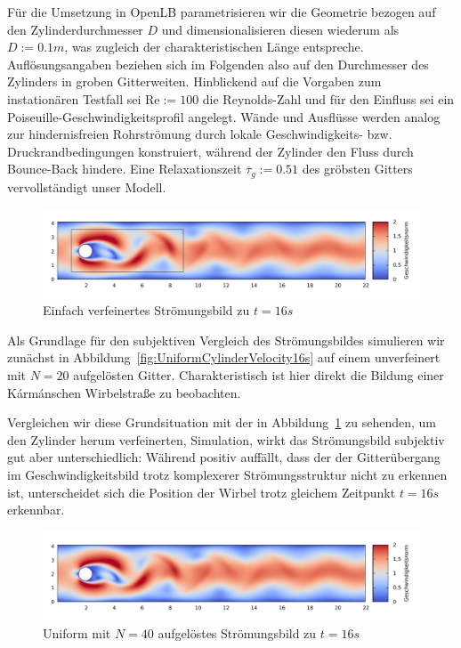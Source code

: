 Für die Umsetzung in OpenLB parametrisieren wir die Geometrie bezogen auf den Zylinderdurchmesser \(D\) und dimensionalisieren diesen wiederum als \(D := 0.1m\), was zugleich der charakteristischen Länge entspreche. Auflösungsangaben beziehen sich im Folgenden also auf den Durchmesser des Zylinders in groben Gitterweiten. Hinblickend auf die Vorgaben zum instationären Testfall \cite[Kapitel~2.2b]{SchaeferTurek96} sei \(\text{Re}:=100\) die Reynolds-Zahl und für den Einfluss sei ein Poiseuille-Geschwindigkeitsprofil angelegt. Wände und Ausflüsse werden analog zur hindernisfreien Rohrströmung durch lokale Geschwindigkeits- bzw. Druckrandbedingungen konstruiert, während der Zylinder den Fluss durch Bounce-Back hindere. Eine Relaxationszeit \(\overline\tau_g := 0.51\) des gröbsten Gitters vervollständigt unser Modell.

\begin{figure}[h]
\begin{adjustbox}{center}
\includegraphics[width=1.2\textwidth]{img/static/cylinder2d_single_refinement_n20_re100_16s.pdf}
\end{adjustbox}
\caption{Einfach verfeinertes Strömungsbild zu \(t=16s\)}
\label{fig:SingleLevelRefinementCylinderVelocity16s}
\end{figure}

Als Grundlage für den subjektiven Vergleich des Strömungsbildes simulieren wir zunächst in Abbildung~\ref{fig:UniformCylinderVelocity16s} auf einem unverfeinert mit \(N=20\) aufgelösten Gitter. Charakteristisch ist hier direkt die Bildung einer Kármánschen Wirbelstraße zu beobachten.

\noindent
Vergleichen wir diese Grundsituation mit der in Abbildung~\ref{fig:SingleLevelRefinementCylinderVelocity16s} zu sehenden, um den Zylinder herum verfeinerten, Simulation, wirkt das Strömungsbild subjektiv gut aber unterschiedlich: Während positiv auffällt, dass der der Gitterübergang im Geschwindigkeitsbild trotz komplexerer Strömungsstruktur nicht zu erkennen ist, unterscheidet sich die Position der Wirbel trotz gleichem Zeitpunkt \(t=16s\) erkennbar.

\begin{figure}[H]
\begin{adjustbox}{center}
\includegraphics[width=1.2\textwidth]{img/static/cylinder2d_unrefined_n40_re100_16s.pdf}
\end{adjustbox}
\caption{Uniform mit \(N=40\) aufgelöstes Strömungsbild zu \(t=16s\)}
\label{fig:UniformCylinderVelocityN4016s}
\end{figure}

